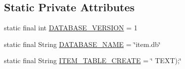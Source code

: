 \subsection*{Static Private Attributes}
\begin{DoxyCompactItemize}
\item 
static final int \hyperlink{classvip2012_1_1g07_1_1shoppinglist_1_1ItemHelper_a1133b80ffe6af5b354389b2a9de1e630}{D\-A\-T\-A\-B\-A\-S\-E\-\_\-\-V\-E\-R\-S\-I\-O\-N} = 1
\item 
static final String \hyperlink{classvip2012_1_1g07_1_1shoppinglist_1_1ItemHelper_a77ae81d85a88d6019d26fa34f6448c50}{D\-A\-T\-A\-B\-A\-S\-E\-\_\-\-N\-A\-M\-E} = \char`\"{}item.\-db\char`\"{}
\item 
static final String \hyperlink{classvip2012_1_1g07_1_1shoppinglist_1_1ItemHelper_a9cb415a10741dbc6a6115f2045544498}{I\-T\-E\-M\-\_\-\-T\-A\-B\-L\-E\-\_\-\-C\-R\-E\-A\-T\-E} = \char`\"{} T\-E\-X\-T);\char`\"{}
\end{DoxyCompactItemize}


